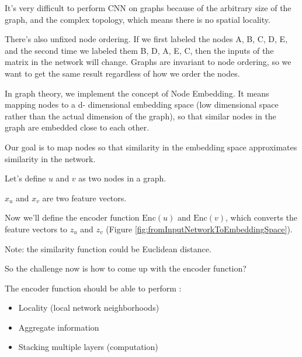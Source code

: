 It’s very difficult to perform CNN on graphs because of the arbitrary size of the graph, and the complex topology, which means there is no spatial locality. \newline

There’s also unfixed node ordering. If we first labeled the nodes A, B, C, D, E, and the second time we labeled them B, D, A, E, C, then the inputs of the matrix in the network will change. Graphs are invariant to node ordering, so we want to get the same result regardless of how we order the nodes. \newline

In graph theory, we implement the concept of Node Embedding. It means mapping nodes to a d- dimensional embedding space (low dimensional space rather than the actual dimension of the graph), so that similar nodes in the graph are embedded close to each other. \newline

Our goal is to map nodes so that similarity in the embedding space approximates similarity in the network.  \newline

Let’s define $u$ and $v$ as two nodes in a graph.  \newline

$x_u$ and $x_v$ are two feature vectors. \newline

Now we’ll define the encoder function $\text{Enc}(u)$ and $\text{Enc}(v)$, which converts the feature vectors to $z_u$ and $z_v$ (Figure \ref{fig:fromInputNetworkToEmbeddingSpace}). \newline

Note: the similarity function could be Euclidean distance. \newline

So the challenge now is how to come up with the encoder function? \newline

The encoder function should be able to perform : \newline

\begin{itemize}
    \item Locality (local network neighborhoods)
    
    \item Aggregate information
    
    \item Stacking multiple layers (computation)
\end{itemize}

